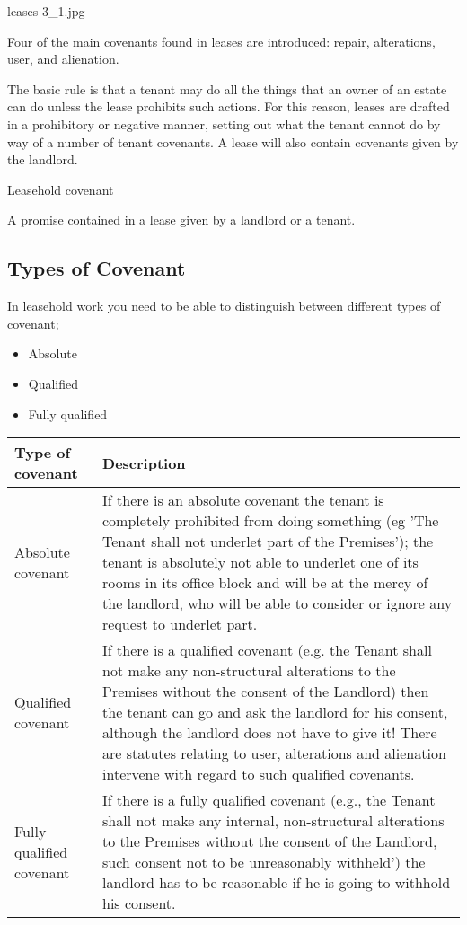\documentclass[
]{article}
\providecommand{\tightlist}{%
  \setlength{\itemsep}{0pt}\setlength{\parskip}{0pt}}
\newenvironment{env-ab392b14-a05f-4d9a-80eb-a63d00eb59ea}
{
    \savenotes\tcolorbox[blanker,breakable,left=5pt,borderline west={2pt}{-4pt}{gold}]
}
{
    \endtcolorbox\spewnotes
}
\begin{document}
leases 3\_1.jpg

Four of the main covenants found in leases are introduced: repair,
alterations, user, and alienation.

The basic rule is that a tenant may do all the things that an owner of
an estate can do unless the lease prohibits such actions. For this
reason, leases are drafted in a prohibitory or negative manner, setting
out what the tenant cannot do by way of a number of tenant covenants. A
lease will also contain covenants given by the landlord.

\begin{env-ab392b14-a05f-4d9a-80eb-a63d00eb59ea}

Leasehold covenant

A promise contained in a lease given by a landlord or a tenant.

\end{env-ab392b14-a05f-4d9a-80eb-a63d00eb59ea}

\hypertarget{types-of-covenant}{%
\subsection{Types of Covenant}\label{types-of-covenant}}

In leasehold work you need to be able to distinguish between different
types of covenant;

\begin{itemize}
\tightlist
\item
  Absolute
\item
  Qualified
\item
  Fully qualified
\end{itemize}

\begin{longtable}[]{@{}ll@{}}
\toprule()
Type of covenant & Description \\
\midrule()
\endhead
Absolute covenant & If there is an absolute covenant the tenant is
completely prohibited from doing something (eg 'The Tenant shall not
underlet part of the Premises'); the tenant is absolutely not able to
underlet one of its rooms in its office block and will be at the mercy
of the landlord, who will be able to consider or ignore any request to
underlet part. \\
Qualified covenant & If there is a qualified covenant (e.g. the Tenant
shall not make any non-structural alterations to the Premises without
the consent of the Landlord) then the tenant can go and ask the landlord
for his consent, although the landlord does not have to give it! There
are statutes relating to user, alterations and alienation intervene with
regard to such qualified covenants. \\
Fully qualified covenant & If there is a fully qualified covenant (e.g.,
the Tenant shall not make any internal, non-structural alterations to
the Premises without the consent of the Landlord, such consent not to be
unreasonably withheld') the landlord has to be reasonable if he is going
to withhold his consent. \\
\bottomrule()
\end{longtable}
\end{document}
